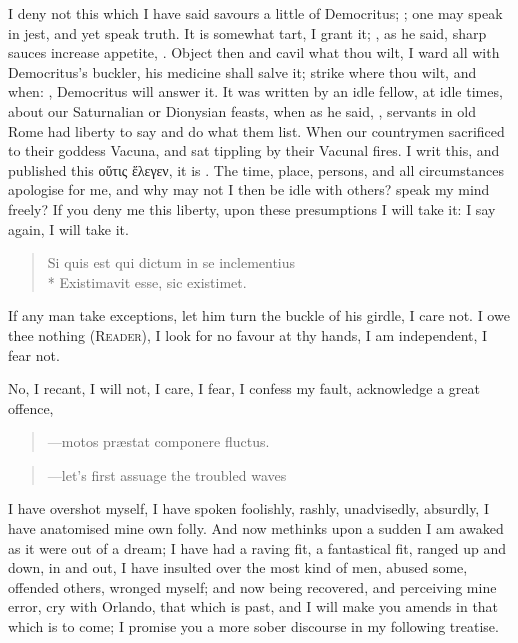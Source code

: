 I deny not this which I have said savours a little of Democritus; 
; one may speak in jest, and
yet speak truth. It is somewhat tart, I grant it; , as he said, sharp sauces increase appetite,
. Object then and cavil
what thou wilt, I ward all with Democritus's buckler, his medicine
shall salve it; strike where thou wilt, and when: ,
Democritus will answer it. It was written by an idle fellow, at idle
times, about our Saturnalian or Dionysian feasts, when as he said,
, servants in old Rome had liberty to say
and do what them list. When our countrymen sacrificed to their goddess
Vacuna, and sat tippling by their Vacunal fires. I writ this, and
published this \textgreek{οὕτις ἕλεγεν}, it is . The time, place,
persons, and all circumstances apologise for me, and why may not I then
be idle with others? speak my mind freely? If you deny me this liberty,
upon these presumptions I will take it: I say again, I will take it.
%
\begin{verse}
\textlatin{Si quis est qui dictum in se inclementius}\\*
\textlatin{Existimavit esse, sic existimet.}
\end{verse}

If any man take exceptions, let him turn the buckle of his girdle, I
care not. I owe thee nothing (\textsc{Reader}), I look for no favour at thy
hands, I am independent, I fear not.

No, I recant, I will not, I care, I fear, I confess my fault,
acknowledge a great offence,
%
\begin{quote}
---\textlatin{motos pr\ae{}stat componere fluctus.}
\end{quote}
\translationrule
\begin{quote}
---let's first assuage the troubled waves
\end{quote}

I have overshot myself, I have spoken foolishly, rashly, unadvisedly,
absurdly, I have anatomised mine own folly. And now methinks upon a
sudden I am awaked as it were out of a dream; I have had a raving fit,
a fantastical fit, ranged up and down, in and out, I have insulted over
the most kind of men, abused some, offended others, wronged myself; and
now being recovered, and perceiving mine error, cry with Orlando,
 that which is past, and I will make you
amends in that which is to come; I promise you a more sober discourse
in my following treatise.

